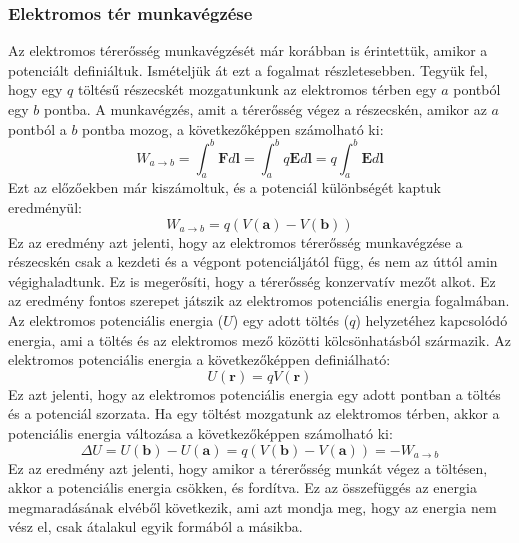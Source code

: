 \documentclass[../main.tex]{subfiles}
\begin{document}
\subsubsection{Elektromos tér munkavégzése}
Az elektromos térerősség munkavégzését már korábban is érintettük, amikor a potenciált definiáltuk. Ismételjük át ezt a fogalmat részletesebben. Tegyük fel, hogy egy $q$ töltésű részecskét mozgatunkunk az elektromos térben egy $a$ pontból egy $b$ pontba. A munkavégzés, amit a térerősség végez a részecskén,
amikor az $a$ pontból a $b$ pontba mozog, a következőképpen számolható ki:
\begin{equation}
    W_{a \to b} = \int_{a}^{b} \mathbf{F} d\mathbf{l} = \int_{a}^{b} q \mathbf{E} d\mathbf{l} = q \int_{a}^{b} \mathbf{E} d\mathbf{l}
\end{equation}
Ezt az előzőekben már kiszámoltuk, és a potenciál különbségét kaptuk eredményül:
\begin{equation}
    W_{a \to b} = q (V(\mathbf{a}) - V(\mathbf{b}))
\end{equation}
Ez az eredmény azt jelenti, hogy az elektromos térerősség munkavégzése a részecskén csak a kezdeti és a végpont potenciáljától függ, és nem az úttól amin végighaladtunk. Ez is megerősíti, hogy a térerősség konzervatív mezőt alkot.
\newline
\newline
Ez az eredmény fontos szerepet játszik az elektromos potenciális energia fogalmában. Az elektromos potenciális energia ($U$) egy adott töltés ($q$) helyzetéhez kapcsolódó energia, ami a töltés és az elektromos mező közötti kölcsönhatásból származik. Az elektromos potenciális energia a következőképpen definiálható:
\begin{equation}
    U(\mathbf{r}) = q V(\mathbf{r})
\end{equation}
Ez azt jelenti, hogy az elektromos potenciális energia egy adott pontban a töltés és a potenciál szorzata. Ha egy töltést mozgatunk az elektromos térben, akkor a potenciális energia változása a következőképpen számolható ki:
\begin{equation}
    \Delta U = U(\mathbf{b}) - U(\mathbf{a}) = q (V(\mathbf{b}) - V(\mathbf{a})) = - W_{a \to b}
\end{equation}
Ez az eredmény azt jelenti, hogy amikor a térerősség munkát végez a töltésen, akkor a potenciális energia csökken, és fordítva. Ez az összefüggés az energia megmaradásának elvéből következik, ami azt mondja meg, hogy az energia nem vész el, csak átalakul egyik formából a másikba.
\end{document}
